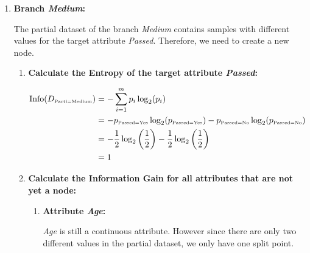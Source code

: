 \documentclass[
english,
smallborders
]{i6prcsht}
\newcommand{\OfSpecificValue}[3]{_{\text{\tiny #1#2#3}}}
\begin{document}
\begin{solution}
\begin{enumerate}
\begin{enumerate}
\begin{center}
	      \end{center}

	\item \textbf{Branch \textit{Medium}:}

	      The partial dataset of the branch \textit{Medium} contains samples with different values for the target attribute \textit{Passed}. Therefore, we need to create a new node.

	      \begin{enumerate}
		      \item \textbf{Calculate the Entropy of the target attribute \textit{Passed}:}

		            \begin{alignat*}{2}
			            \text{Info}(D\OfSpecificValue{Parti}{=}{Medium}) & = -\sum_{i=1}^{m}p_i \log_2(p_i)                                                                                                                          \\
			                                                             & = -p\OfSpecificValue{Passed}{=}{Yes} \log_2(p\OfSpecificValue{Passed}{=}{Yes})- p\OfSpecificValue{Passed}{=}{No} \log_2(p\OfSpecificValue{Passed}{=}{No}) \\
			                                                             & = -\frac{1}{2} \log_2\left(\frac{1}{2}\right) - \frac{1}{2} \log_2\left(\frac{1}{2}\right)                                                                \\
			                                                             & = 1                                                                                                                                                       \\
		            \end{alignat*}

		      \item \textbf{Calculate the Information Gain for all attributes that are not yet a node:}

		            \begin{enumerate}
			            \item \textbf{Attribute \textit{Age}:}

			                  \textit{Age} is still a continuous attribute. However since there are only two different values in the partial dataset, we only have one split point.


\end{enumerate}
\end{enumerate}
\end{enumerate}
\end{enumerate}
\end{solution}
\end{document}

